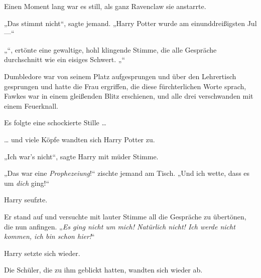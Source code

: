 Einen Moment lang war es still, als ganz Ravenclaw sie anstarrte.

„Das stimmt nicht“, sagte jemand.
„Harry Potter wurde am einunddreißigsten Jul —“

„“, ertönte eine gewaltige, hohl klingende Stimme, die alle Gespräche durchschnitt wie ein eisiges Schwert.
„“

Dumbledore war von seinem Platz aufgesprungen und über den Lehrertisch gesprungen und hatte die Frau ergriffen, die diese fürchterlichen Worte sprach, Fawkes war in einem gleißenden Blitz erschienen, und alle drei verschwanden mit einem Feuerknall.

Es folgte eine schockierte Stille …

… und viele Köpfe wandten sich Harry Potter zu.

„Ich war’s nicht“, sagte Harry mit müder Stimme.

„Das war eine \emph{Prophezeiung}!“ zischte jemand am Tisch.
„Und ich wette, dass es um \emph{dich} ging!“

Harry seufzte.

Er stand auf und versuchte mit lauter Stimme all die Gespräche zu übertönen, die nun anfingen.
„\emph{Es ging nicht um mich! Natürlich nicht! Ich werde nicht kommen, ich bin schon hier!}“

Harry setzte sich wieder.

Die Schüler, die zu ihm geblickt hatten, wandten sich wieder ab.

